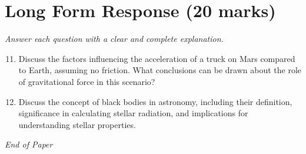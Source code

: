 \documentclass[12pt]{article}
\begin{document}
\section*{Long Form Response (20 marks)}
\textit{Answer each question with a clear and complete explanation.}
\begin{enumerate}[label=\arabic*.]
\setcounter{enumi}{10}
\item Discuss the factors influencing the acceleration of a truck on Mars compared to Earth, assuming no friction. What conclusions can be drawn about the role of gravitational force in this scenario?
\item Discuss the concept of black bodies in astronomy, including their definition, significance in calculating stellar radiation, and implications for understanding stellar properties.
\end{enumerate}

\vfill
\noindent\textit{End of Paper}
\end{document}
